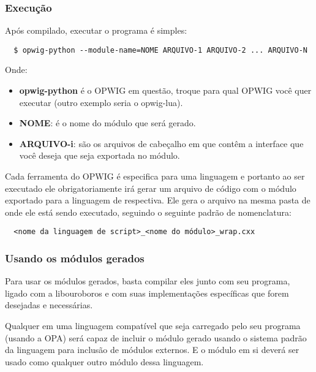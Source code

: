 \subsubsection{Execução}
Após compilado, executar o programa é simples:
\begin{verbatim}
  $ opwig-python --module-name=NOME ARQUIVO-1 ARQUIVO-2 ... ARQUIVO-N
\end{verbatim}
Onde:
\begin{itemize}
  \item \textbf{opwig-python} é o OPWIG em questão, troque para qual OPWIG você quer executar 
    (outro exemplo seria o opwig-lua).
  \item \textbf{NOME}: é o nome do módulo que será gerado.
  \item \textbf{ARQUIVO-i}: são os arquivos de cabeçalho em \CXX{} que contêm a interface
    que você deseja que seja exportada no módulo.
\end{itemize}

Cada ferramenta do OPWIG é especifica para uma linguagem e portanto ao ser executado
ele obrigatoriamente irá gerar um arquivo de código com o módulo exportado para a
linguagem de \script{} respectiva. Ele gera o arquivo na mesma pasta de onde ele está 
sendo executado, seguindo o seguinte padrão de nomenclatura:
\begin{verbatim}
  <nome da linguagem de script>_<nome do módulo>_wrap.cxx
\end{verbatim}

\subsubsection{Usando os módulos gerados}
Para usar os módulos gerados, basta compilar eles junto com seu programa, ligado com
a libouroboros e com suas implementações específicas que forem desejadas e
necessárias.

Qualquer \script{} em uma linguagem compatível que seja carregado pelo seu programa
(usando a OPA) será capaz de incluir o módulo gerado usando o sistema padrão da
linguagem para inclusão de módulos externos. E o módulo em si deverá ser
usado como qualquer outro módulo dessa linguagem.
